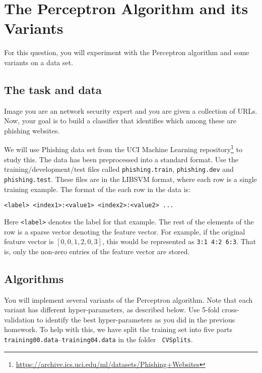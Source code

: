 \section{The Perceptron Algorithm and its Variants}\label{sec:q3}

For this question, you will experiment with the Perceptron algorithm
and some variants on a data set.

\subsection{The task and data}

Image you are an network security expert and you are given a collection of URLs.
Now, your goal is to build a classifier that identifies which among these are phishing websites.

We will use Phishing data set from the UCI Machine Learning
repository\footnote{\url{https://archive.ics.uci.edu/ml/datasets/Phishing+Websites}}
to study this.  The data has been preprocessed into a standard format.
Use the training/development/test files called {\tt phishing.train},
{\tt phishing.dev} and {\tt phishing.test}.  These files are in the
LIBSVM format, where each row is a single training example. The format
of the each row in the data is:

\begin{center} 
  {\tt <label> <index1>:<value1> <index2>:<value2> ...}
\end{center}

Here {\tt <label>} denotes the label for that example.  The rest of
the elements of the row is a sparse vector denoting the feature
vector.  For example, if the original feature vector is
$[0, 0, 1, 2, 0, 3]$, this would be represented as {\tt 3:1 4:2 6:3}.
That is, only the non-zero entries of the feature vector are stored.

\subsection{Algorithms}

You will implement several variants of the Perceptron algorithm. Note
that each variant has different hyper-parameters, as described
below. Use 5-fold cross-validation to identify the best
hyper-parameters as you did in the previous homework. To help with
this, we have split the training set into five parts {\tt
  training00.data}--{\tt training04.data} in the folder {\tt
  CVSplits}.

